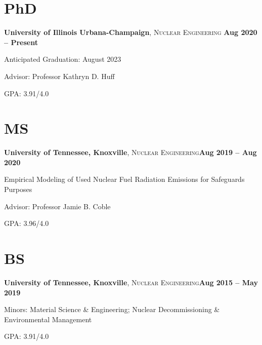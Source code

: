 \documentclass[margin,line]{resume}
\begin{document}
\begin{resume}
    \section{\mysidestyle PhD}
    \textbf{University of Illinois Urbana-Champaign}, \textsc{Nuclear Engineering}\hfill \textbf{ Aug 2020 -- Present}\vspace{-3mm}\\\vspace{-1mm}%
    \begin{list2}
        \item Anticipated Graduation: August 2023
        \item Advisor: Professor Kathryn D. Huff
        \item GPA: 3.91/4.0
    \end{list2}\vspace{-1.5mm}
    \section{\mysidestyle MS}
    \textbf{University of Tennessee, Knoxville}, \textsc{Nuclear Engineering}\hfill\textbf{Aug 2019 -- Aug 2020}\vspace{-3mm}\\\vspace{-1mm}%
    \begin{list2}
        \item Empirical Modeling of Used Nuclear Fuel Radiation Emissions for Safeguards Purposes
        \item Advisor: Professor Jamie B. Coble
        \item GPA: 3.96/4.0
    \end{list2}
    \section{\mysidestyle BS}
    \textbf{University of Tennessee, Knoxville}, \textsc{Nuclear Engineering}\hfill\textbf{Aug 2015 -- May 2019}\vspace{-3mm}\\\vspace{-1mm}%
    \begin{list2}
        \item Minors: Material Science \& Engineering; Nuclear 
              Decommissioning \& Environmental Management
        \item GPA: 3.91/4.0
    \end{list2}
    

\end{resume}
\end{document}
